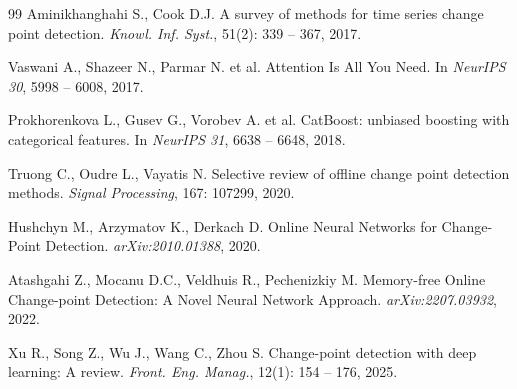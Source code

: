 \documentclass[12pt,a4paper]{article}
\begin{document}
\begin{thebibliography}{99}
 Aminikhanghahi S., Cook D.J. A survey of methods for time series change point detection. \textit{Knowl. Inf. Syst.}, 51(2): 339 -- 367, 2017.

 Vaswani A., Shazeer N., Parmar N. et al. Attention Is All You Need. In \textit{NeurIPS 30}, 5998 -- 6008, 2017.

 Prokhorenkova L., Gusev G., Vorobev A. et al. CatBoost: unbiased boosting with categorical features. In \textit{NeurIPS 31}, 6638 -- 6648, 2018.

 Truong C., Oudre L., Vayatis N. Selective review of offline change point detection methods. \textit{Signal Processing}, 167: 107299, 2020.

 Hushchyn M., Arzymatov K., Derkach D. Online Neural Networks for Change-Point Detection. \textit{arXiv:2010.01388}, 2020.

 Atashgahi Z., Mocanu D.C., Veldhuis R., Pechenizkiy M. Memory-free Online Change-point Detection: A Novel Neural Network Approach. \textit{arXiv:2207.03932}, 2022.

 Xu R., Song Z., Wu J., Wang C., Zhou S. Change-point detection with deep learning: A review. \textit{Front. Eng. Manag.}, 12(1): 154 -- 176, 2025.

\end{thebibliography}
\end{document}
